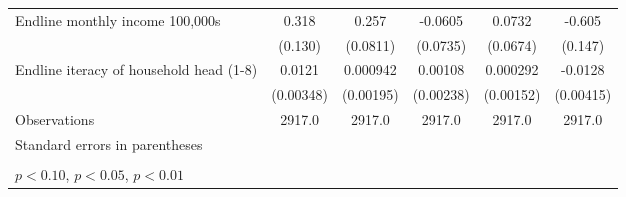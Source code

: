 \begin{table}[htbp]
\begin{tabular*}{1.0\hsize}{@{\hskip\tabcolsep\extracolsep\fill}l*{5}{c}}
\addlinespace
Endline monthly income 100,000s &       0.318\sym{**} &       0.257\sym{***}&     -0.0605         &      0.0732         &      -0.605\sym{***}\\
                                &     (0.130)         &    (0.0811)         &    (0.0735)         &    (0.0674)         &     (0.147)         \\
\addlinespace
Endline iteracy of household head (1-8)&      0.0121\sym{***}&    0.000942         &     0.00108         &    0.000292         &     -0.0128\sym{***}\\
                                &   (0.00348)         &   (0.00195)         &   (0.00238)         &   (0.00152)         &   (0.00415)         \\
\midrule
Observations                    &      2917.0         &      2917.0         &      2917.0         &      2917.0         &      2917.0         \\
\bottomrule
\multicolumn{6}{l}{\footnotesize Standard errors in parentheses}\\
\multicolumn{6}{l}{\footnotesize }\\
\multicolumn{6}{l}{\footnotesize \sym{*} \(p<0.10\), \sym{**} \(p<0.05\), \sym{***} \(p<0.01\)}\\
\end{tabular*}
\end{table}
